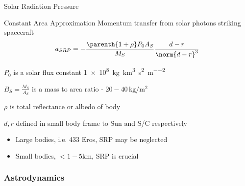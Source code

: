 \begin{frame}[noframenumbering]{Solar Radiation Pressure} %

\begin{block}{Constant Area Approximation}
Momentum transfer from solar photons striking spacecraft
\begin{align*}
    a_{SRP} = - \frac{\parenth{1 + \rho} P_0 A_{S}}{M_S} \frac{d - r}{\norm{d-r}^3}
\end{align*}

\( P_0\) is a solar flux constant \SI{1e8}{\kilogram\kilo\meter\cubed\per\second\squared\per\meter\squared}

\( B_S = \frac{M_S}{A_S} \) is a mass to area ratio - \( 20 - 40 \, \si{\kilogram\per\meter\squared} \)

\( \rho \) is total reflectance or albedo of body

\( d, r \) defined in small body frame to Sun and S/C respectively
\end{block}
\begin{itemize}
    \item Large bodies, i.e. 433 Eros, SRP may be neglected
    \item Small bodies, \( < 1-5 \si{\kilo\meter} \), SRP is crucial
\end{itemize}
\end{frame} %

\begin{frame}[noframenumbering,label=astro] %
\frametitle{Astrodynamics}

\hyperlink{sim}{}
\end{frame} %


